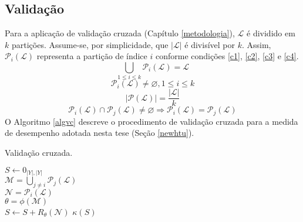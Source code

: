 \subsection{Validação}
Para a aplicação de validação cruzada (Capítulo \ref{metodologia}), $\mathcal{L}$ é dividido em $k$ partições.
Assume-se, por simplicidade, que $|\mathcal{L}|$ é divisível por $k$.
Assim, $\mathcal{P}_i(\mathcal{L})$ representa a partição de índice $i$ conforme condições \ref{c1}, \ref{c2}, \ref{c3} e \ref{c4}.
\begin{equation}\label{c1}
  \bigcup\limits_{1 \leq i \leq k} \mathcal{P}_i(\mathcal{L}) = \mathcal{L}
\end{equation}
\begin{equation}\label{c2}
  \mathcal{P}_i(\mathcal{L}) \neq \varnothing, 1 \leq i \leq k
\end{equation}
\begin{equation}\label{c3}
   |\mathcal{P}(\mathcal{L})| = \frac{|\mathcal{L}|}{k}
\end{equation}
\begin{equation}\label{c4}
  \mathcal{P}_i(\mathcal{L}) \cap \mathcal{P}_j(\mathcal{L}) \neq \varnothing \Rightarrow \mathcal{P}_i(\mathcal{L})=\mathcal{P}_j(\mathcal{L})
\end{equation}
O Algoritmo \ref{algvc} descreve o procedimento de validação cruzada para a medida de desempenho adotada nesta tese (Seção \ref{newhtu}).
\begin{algoritmo}
\caption{Validação cruzada.}
\label{algvc}
\small
{}
   {
  $S \leftarrow 0_{|Y|,|Y|}$  \\
   {
      $\mathcal{M}=\bigcup\limits_{j\neq i}\mathcal{P}_j(\mathcal{L})$ \\
      $\mathcal{N}=\mathcal{P}_i(\mathcal{L})$ \\
      $\theta = \phi(\mathcal{M})$ \\
      $S \leftarrow S + R_\theta(\mathcal{N})$
    }
    \Retorna $\kappa(S)$
  }
\end{algoritmo}

